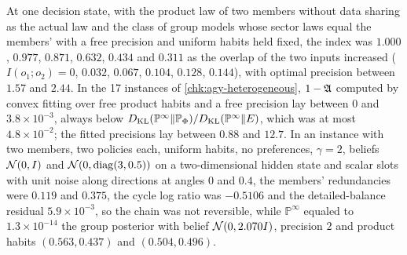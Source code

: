 \begin{numcheck}\label{chk:agy-index}
At one decision state, with the product law of two members without data sharing as the actual law and the class of group models whose sector laws equal the members' with a free precision and uniform habits held fixed, the index was $1.000$, $0.977$, $0.871$, $0.632$, $0.434$ and $0.311$ as the overlap of the two inputs increased ($I(o_1;o_2)=0$, $0.032$, $0.067$, $0.104$, $0.128$, $0.144$), with optimal precision between $1.57$ and $2.44$. In the 17 instances of \cref{chk:agy-heterogeneous}, $1-\mathfrak{A}$ computed by convex fitting over free product habits and a free precision lay between $0$ and $3.8\times10^{-3}$, always below $D_{\mathrm{KL}}(\mathbb P^\infty\Vert\mathbb P_\Phi)/D_{\mathrm{KL}}(\mathbb P^\infty\Vert E)$, which was at most $4.8\times10^{-2}$; the fitted precisions lay between $0.88$ and $12.7$. In an instance with two members, two policies each, uniform habits, no preferences, $\gamma=2$, beliefs $\mathcal{N}(0,I)$ and $\mathcal{N}(0,\operatorname{diag}(3,0.5))$ on a two-dimensional hidden state and scalar slots with unit noise along directions at angles $0$ and $0.4$, the members' redundancies were $0.119$ and $0.375$, the cycle log ratio was $-0.5106$ and the detailed-balance residual $5.9\times10^{-3}$, so the chain was not reversible, while $\mathbb P^\infty$ equaled to $1.3\times10^{-14}$ the group posterior with belief $\mathcal{N}(0,2.070I)$, precision $2$ and product habits $(0.563,0.437)$ and $(0.504,0.496)$.
\end{numcheck}

